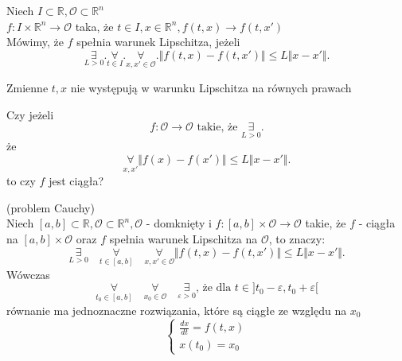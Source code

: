 \documentclass[../main.tex]{subfiles}
\begin{document}
    \begin{definicja}
        Niech $I\subset \mathbb{R}, \mathcal{O}\subset \mathbb{R}^n$ \\
        $f: I\times\mathbb{R}^n \to \mathcal{O}$ taka, że $t\in I, x\in \mathbb{R}^n, f(t,x) \to f(t,x')$\\
        Mówimy, że $f$ spełnia warunek Lipschitza, jeżeli
        \[
            \underset{L>0}{\exists}. \underset{t\in I}{\forall}. \underset{x,x'\in \mathcal{O}}{\forall}. \Vert f(t,x) - f(t,x')  \Vert \leq L \Vert x - x' \Vert
        .\]
    \end{definicja}
        \begin{uwaga}
            Zmienne $t,x$ nie występują w warunku Lipschitza na równych prawach
        \end{uwaga}
        \begin{pytanie}
            Czy jeżeli \[
                f:\mathcal{O}\to\mathcal{O}\text{ takie, że } \underset{L>0}{\exists}
            .\] że \[
            \underset{x,x'}{\forall}  \Vert f(x) - f(x') \Vert \leq L \Vert x - x' \Vert
            .\] to czy $f $ jest ciągła?
        \end{pytanie}

        \pagebreak
        \begin{tw}
            (problem Cauchy)\\
            Niech $[a,b] \subset \mathbb{R}, \mathcal{O}\subset\mathbb{R}^n, \mathcal{O}$ - domknięty i $f:[a,b]\times\mathcal{O}\to\mathcal{O}$ takie, że $f$ - ciągła na $[a,b]\times\mathcal{O}$ oraz $f$ spełnia warunek Lipschitza na $\mathcal{O}$, to znaczy:
            \[
                \underset{L>0}{\exists}\quad \underset{t\in[a,b]}{\forall}\quad \underset{x,x'\in\mathcal{O}}{\forall} \Vert f(t,x) - f(t,x') \Vert \leq L \Vert x-x' \Vert
            .\] Wówczas \[
            \underset{t_0\in[a,b]}{\forall}\quad \underset{x_0\in\mathcal{O}}{\forall}\quad \underset{\varepsilon>0}{\exists} \text{, że dla } t\in ]t_0-\varepsilon, t_0+\varepsilon[
            \]
            równanie ma jednoznaczne rozwiązania, które są ciągłe ze względu na $x_0$
            \begin{equation}
            \begin{cases}\label{eq:cauchy}
                \frac{dx}{dt} = f(t,x)\\
                x(t_0) = x_0
            \end{cases}
            \end{equation}
        \end{tw}
\end{document}

